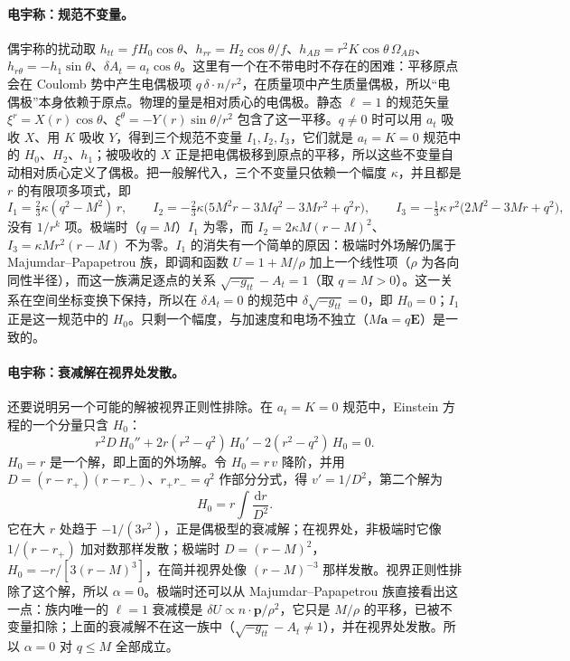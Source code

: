 \documentclass[11pt,a4paper]{ctexart}
\newcommand{\dd}{\mathrm d}
\begin{document}
\paragraph{电宇称：规范不变量。}偶宇称的扰动取 $h_{tt}=fH_0\cos\theta$、$h_{rr}=H_2\cos\theta/f$、$h_{AB}=r^2K\cos\theta\,\Omega_{AB}$、$h_{r\theta}=-h_1\sin\theta$、$\delta A_t=a_t\cos\theta$。这里有一个在不带电时不存在的困难：平移原点会在 Coulomb 势中产生电偶极项 $q\,\delta\cdot n/r^2$，在质量项中产生质量偶极，所以“电偶极”本身依赖于原点。物理的量是相对质心的电偶极。静态 $\ell=1$ 的规范矢量 $\xi^r=X(r)\cos\theta$、$\xi^\theta=-Y(r)\sin\theta/r^2$ 包含了这一平移。$q\neq0$ 时可以用 $a_t$ 吸收 $X$、用 $K$ 吸收 $Y$，得到三个规范不变量 $I_1,I_2,I_3$，它们就是 $a_t=K=0$ 规范中的 $H_0$、$H_2$、$h_1$；被吸收的 $X$ 正是把电偶极移到原点的平移，所以这些不变量自动相对质心定义了偶极。把一般解代入，三个不变量只依赖一个幅度 $\kappa$，并且都是 $r$ 的有限项多项式，即
\begin{equation*}
I_1=\tfrac23\kappa(q^2-M^2)\,r,\qquad I_2=-\tfrac23\kappa\big(5M^2r-3Mq^2-3Mr^2+q^2r\big),\qquad I_3=-\tfrac13\kappa\,r^2\big(2M^2-3Mr+q^2\big),
\end{equation*}
没有 $1/r^k$ 项。极端时（$q=M$）$I_1$ 为零，而 $I_2=2\kappa M(r-M)^2$、$I_3=\kappa Mr^2(r-M)$ 不为零。$I_1$ 的消失有一个简单的原因：极端时外场解仍属于 Majumdar--Papapetrou 族，即调和函数 $U=1+M/\rho$ 加上一个线性项（$\rho$ 为各向同性半径），而这一族满足逐点的关系 $\sqrt{-g_{tt}}-A_t=1$（取 $q=M>0$）。这一关系在空间坐标变换下保持，所以在 $\delta A_t=0$ 的规范中 $\delta\sqrt{-g_{tt}}=0$，即 $H_0=0$；$I_1$ 正是这一规范中的 $H_0$。只剩一个幅度，与加速度和电场不独立（$M\boldsymbol a=q\boldsymbol E$）是一致的。

\paragraph{电宇称：衰减解在视界处发散。}还要说明另一个可能的解被视界正则性排除。在 $a_t=K=0$ 规范中，Einstein 方程的一个分量只含 $H_0$：
\begin{equation}
r^2D\,H_0''+2r(r^2-q^2)\,H_0'-2(r^2-q^2)\,H_0=0 .
\label{eq:dip-ode}
\end{equation}
$H_0=r$ 是一个解，即上面的外场解。令 $H_0=r\,v$ 降阶，并用 $D=(r-r_+)(r-r_-)$、$r_+r_-=q^2$ 作部分分式，得 $v'=1/D^2$，第二个解为
\begin{equation*}
H_0=r\int\frac{\dd r}{D^2}.
\end{equation*}
它在大 $r$ 处趋于 $-1/(3r^2)$，正是偶极型的衰减解；在视界处，非极端时它像 $1/(r-r_+)$ 加对数那样发散；极端时 $D=(r-M)^2$，$H_0=-r/[3(r-M)^3]$，在简并视界处像 $(r-M)^{-3}$ 那样发散。视界正则性排除了这个解，所以 $\alpha=0$。极端时还可以从 Majumdar--Papapetrou 族直接看出这一点：族内唯一的 $\ell=1$ 衰减模是 $\delta U\propto n\cdot\boldsymbol p/\rho^2$，它只是 $M/\rho$ 的平移，已被不变量扣除；上面的衰减解不在这一族中（$\sqrt{-g_{tt}}-A_t\neq1$），并在视界处发散。所以 $\alpha=0$ 对 $q\le M$ 全部成立。
\end{document}
